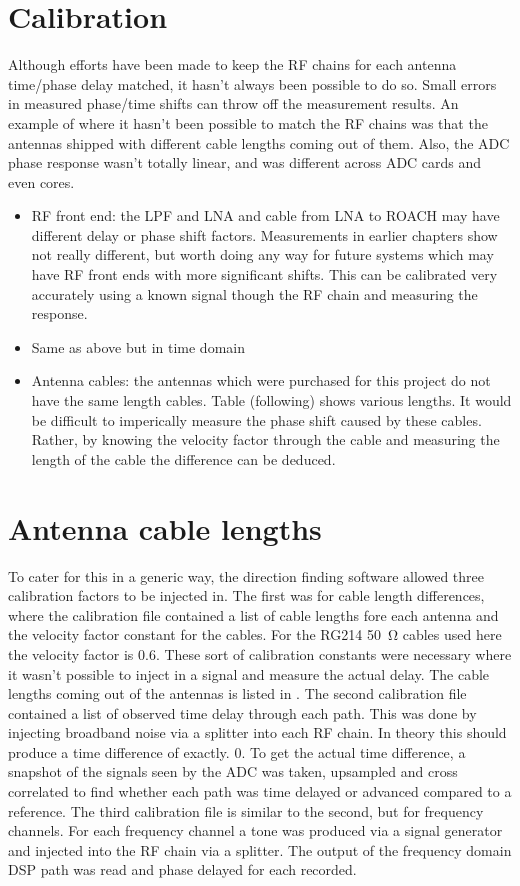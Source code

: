 \section{Calibration}


Although efforts have been made to keep the RF chains for each antenna time/phase delay matched, it hasn't always been possible to do so. Small errors in measured phase/time shifts can throw off the measurement results. An example of where it hasn't been possible to match the RF chains was that the antennas shipped with different cable lengths coming out of them. Also, the ADC phase response wasn't totally linear, and was different across ADC cards and even cores. 
\begin{itemize}
  \item RF front end: the LPF and LNA and cable from LNA to ROACH may have different delay or phase shift factors. Measurements in earlier chapters show not really different, but worth doing any way for future systems which may have RF front ends with more significant shifts. This can be calibrated very accurately using a known signal though the RF chain and measuring the response.
  \item Same as above but in time domain
  \item Antenna cables: the antennas which were purchased for this project do not have the same length cables. Table (following) shows various lengths. It would be difficult to imperically measure the phase shift caused by these cables. Rather, by knowing the velocity factor through the cable and measuring the length of the cable the difference can be deduced.
\end{itemize}

\section{Antenna cable lengths}

To cater for this in a generic way, the direction finding software allowed three calibration factors to be injected in. 
The first was for cable length differences, where the calibration file contained a list of cable lengths fore each antenna and the velocity factor constant for the cables. For the RG214 \SI{50}{\ohm} cables used here the velocity factor is 0.6. These sort of calibration constants were necessary where it wasn't possible to inject in a signal and measure the actual delay. The cable lengths coming out of the antennas is listed in .
The second calibration file contained a list of observed time delay through each path. This was done by injecting broadband noise via a splitter into each RF chain. In theory this should produce a time difference of exactly. 0. To get the actual time difference, a snapshot of the signals seen by the ADC was taken, upsampled and cross correlated to find whether each path was time delayed or advanced compared to a reference.
The third calibration file is similar to the second, but for frequency channels. For each frequency channel a tone was produced via a signal generator and injected into the RF chain via a splitter. The output of the frequency domain DSP path was read and phase delayed for each recorded.

